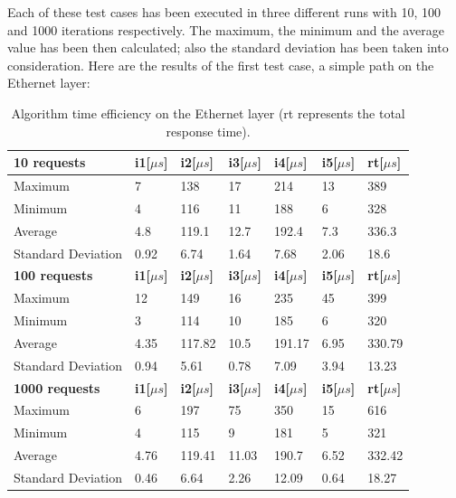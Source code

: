 \documentclass[10pt,a4paper]{report}
\begin{document}
Each of these test cases has been executed in three different runs
with 10, 100 and 1000 iterations respectively. The maximum, the
minimum and the average value has been then calculated; also the
standard deviation has been taken into consideration. Here are the
results of the first test case, a simple path on the Ethernet layer:
\begin{table}[!htbp]
  \begin{center}
    \begin{tabular}{|l||l|l|l|l|l||l|}
      \hline
      \textbf{10 requests} & \textbf{i1[\(\mu s\)]} & \textbf{i2[\(\mu s\)]} & \textbf{i3[\(\mu s\)]} & \textbf{i4[\(\mu s\)]} &
      \textbf{i5[\(\mu s\)]} & \textbf{rt[\(\mu s\)]} \\\hline
      Maximum & 7 & 138 & 17 & 214 & 13 & 389 \\
      Minimum & 4 & 116 & 11 & 188 & 6 & 328 \\
      Average & 4.8 & 119.1 & 12.7 & 192.4 & 7.3 & 336.3 \\
      Standard Deviation & 0.92 & 6.74 & 1.64 & 7.68 & 2.06 & 18.6
      \\ \hline
      \textbf{100 requests} & \textbf{i1[\(\mu s\)]} & \textbf{i2[\(\mu s\)]} & \textbf{i3[\(\mu s\)]} & \textbf{i4[\(\mu s\)]} &
      \textbf{i5[\(\mu s\)]} & \textbf{rt[\(\mu s\)]} \\\hline
      Maximum & 12 & 149 & 16 & 235 & 45 & 399 \\
      Minimum & 3 & 114 & 10 & 185 & 6 & 320 \\
      Average & 4.35 & 117.82 & 10.5 & 191.17 & 6.95 & 330.79 \\
      Standard Deviation & 0.94 & 5.61 & 0.78 & 7.09 & 3.94 & 13.23
      \\ \hline
      \textbf{1000 requests} & \textbf{i1[\(\mu s\)]} & \textbf{i2[\(\mu s\)]} & \textbf{i3[\(\mu s\)]} & \textbf{i4[\(\mu s\)]} &
      \textbf{i5[\(\mu s\)]} & \textbf{rt[\(\mu s\)]} \\\hline
      Maximum & 6 & 197 & 75 & 350 & 15 & 616 \\
      Minimum & 4 & 115 & 9 & 181 & 5 & 321 \\
      Average & 4.76 & 119.41 & 11.03 & 190.7 & 6.52 & 332.42 \\
      Standard Deviation & 0.46 & 6.64 & 2.26 & 12.09 & 0.64 & 18.27
      \\ \hline
    \end{tabular}
    \caption[Algorithm time efficiency on Ethernet]{Algorithm time
      efficiency on the Ethernet layer (rt represents the total
      response time).}
    \label{tab:test_eth}
  \end{center}
\end{table}
\end{document}
